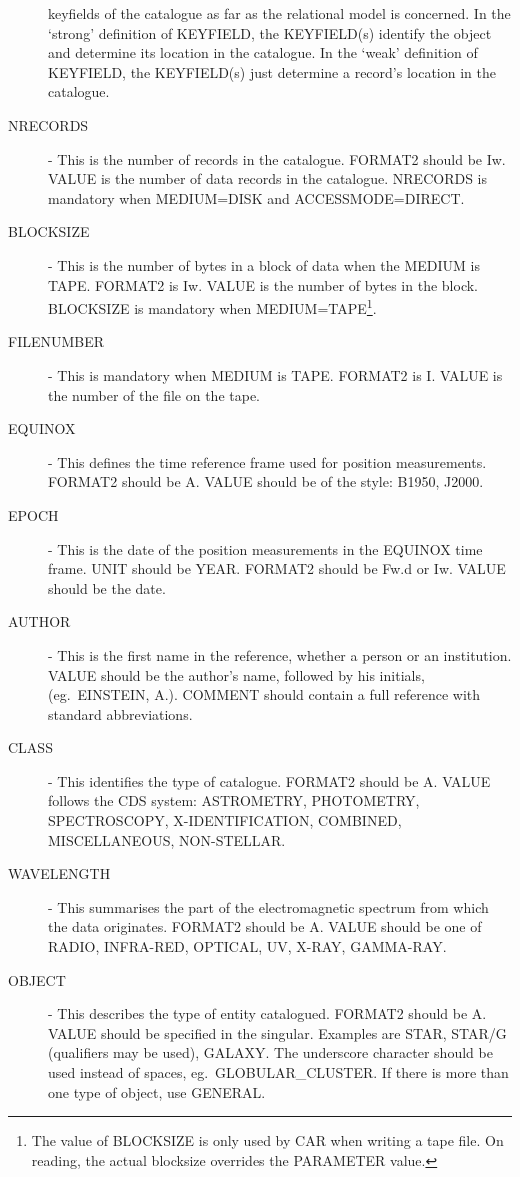 \begin{description}
keyfields of the catalogue as far as the relational model is concerned.
In the `strong' definition of KEYFIELD, the KEYFIELD(s) identify the object and
determine its location in the catalogue.
In the `weak' definition of KEYFIELD, the KEYFIELD(s) just determine a record's
location in the catalogue.
\item [NRECORDS] -
This is the number of records in the catalogue.
FORMAT2 should be Iw.
VALUE is the number of data records in the catalogue.
NRECORDS is mandatory when MEDIUM=DISK  and  ACCESSMODE=DIRECT.
\item [BLOCKSIZE] -
This is the number of bytes in a block of data when the MEDIUM is TAPE.
FORMAT2 is Iw.
VALUE is the number of bytes in the block.
BLOCKSIZE is  mandatory when MEDIUM=TAPE\footnote
{The value of BLOCKSIZE is only used by CAR when writing a tape file.
On reading, the actual blocksize overrides the PARAMETER value.}.
\item [FILENUMBER] -
This is mandatory when MEDIUM is TAPE.
FORMAT2 is I.
VALUE is the number of the file on the tape.
\item [EQUINOX] -
This defines the time reference frame used for position measurements.
FORMAT2 should be A.
VALUE should be of the style: B1950, J2000.
\item [EPOCH] -
This is the date of the position measurements in the EQUINOX time frame.
UNIT should be YEAR.
FORMAT2 should be Fw.d or Iw.
VALUE should be the date.
\item [AUTHOR] -
This is the first name in the reference, whether a person or an institution.
VALUE should be the author's name, followed by his initials,
(eg.\ EINSTEIN, A.).
COMMENT should contain a full reference with standard abbreviations.
\item [CLASS] -
This identifies the type of catalogue.
FORMAT2 should be A.
VALUE follows the CDS system: ASTROMETRY, PHOTOMETRY, SPECTROSCOPY,
X-IDENTIFICATION, COMBINED, MISCELLANEOUS, NON-STELLAR.
\item [WAVELENGTH] -
This summarises the part of the electromagnetic spectrum from which the data
originates.
FORMAT2 should be A.
VALUE should be one of RADIO, INFRA-RED, OPTICAL, UV, X-RAY, GAMMA-RAY.
\item [OBJECT] -
This describes the type of entity catalogued.
FORMAT2 should be A.
VALUE should be specified in the singular.
Examples are STAR, STAR/G (qualifiers may be used), GALAXY.
The underscore character should be used instead of spaces,
eg.\ GLOBULAR\_CLUSTER.
If there is more than one type of object, use GENERAL.

\end{description}
